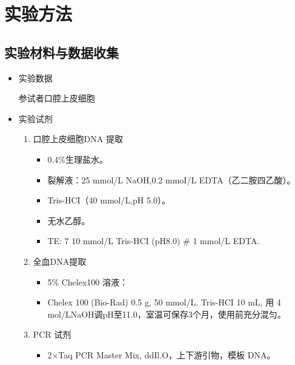 \documentclass[AutoFakeBold]{LZUThesis}
\begin{document}
\section{实验方法}

\subsection{实验材料与数据收集}
\begin{itemize}
    \item 实验数据\par
    参试者口腔上皮细胞
    \item 实验试剂\par
    \begin{enumerate}
        \item 口腔上皮细胞DNA 提取\par
        \begin{itemize}
            \item 0.4\%生理盐水。\par
            \item 裂解液：25 mmol/L NaOH,0.2 mmoI/L EDTA（乙二胺四乙酸）。\par
            \item Tris-HCI（40 mmol/L,pH 5.0）。\par
            \item 无水乙醇。\par
            \item TE: 7 10 mmol/L Tris-HCI (pH8.0) # 1 mmol/L EDTA.\par
        \end{itemize}
        \item 全血DNA提取\par
        \begin{itemize}
            \item 5\% Chelex100 溶液：\par
            \item Chelex 100 (Bio-Rad) 0.5 g, 50 mmol/L. Tris-HCI 10 mL, 用
            4 mol/LNaOH调pH至11.0，室温可保存3个月，使用前充分混匀。\par
        \end{itemize}
        \item PCR 试剂\par
        \begin{itemize}
            \item 2×Taq PCR Master Mix, ddIl.O，上下游引物，模板 DNA。\par
        \end{itemize}

\end{enumerate}
\end{itemize}
\end{document}
